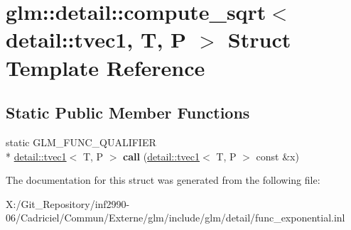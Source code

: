 \hypertarget{structglm_1_1detail_1_1compute__sqrt_3_01detail_1_1tvec1_00_01_t_00_01_p_01_4}{\section{glm\-:\-:detail\-:\-:compute\-\_\-sqrt$<$ detail\-:\-:tvec1, T, P $>$ Struct Template Reference}
\label{structglm_1_1detail_1_1compute__sqrt_3_01detail_1_1tvec1_00_01_t_00_01_p_01_4}
}
\subsection*{Static Public Member Functions}
\begin{DoxyCompactItemize}
\item 
\hypertarget{structglm_1_1detail_1_1compute__sqrt_3_01detail_1_1tvec1_00_01_t_00_01_p_01_4_a19be057111b1a9d9459f75355ac256f5}{static G\-L\-M\-\_\-\-F\-U\-N\-C\-\_\-\-Q\-U\-A\-L\-I\-F\-I\-E\-R \\*
\hyperlink{structglm_1_1detail_1_1tvec1}{detail\-::tvec1}$<$ T, P $>$ {\bfseries call} (\hyperlink{structglm_1_1detail_1_1tvec1}{detail\-::tvec1}$<$ T, P $>$ const \&x)}\label{structglm_1_1detail_1_1compute__sqrt_3_01detail_1_1tvec1_00_01_t_00_01_p_01_4_a19be057111b1a9d9459f75355ac256f5}

\end{DoxyCompactItemize}


The documentation for this struct was generated from the following file\-:\begin{DoxyCompactItemize}
\item 
X\-:/\-Git\-\_\-\-Repository/inf2990-\/06/\-Cadriciel/\-Commun/\-Externe/glm/include/glm/detail/func\-\_\-exponential.\-inl\end{DoxyCompactItemize}
